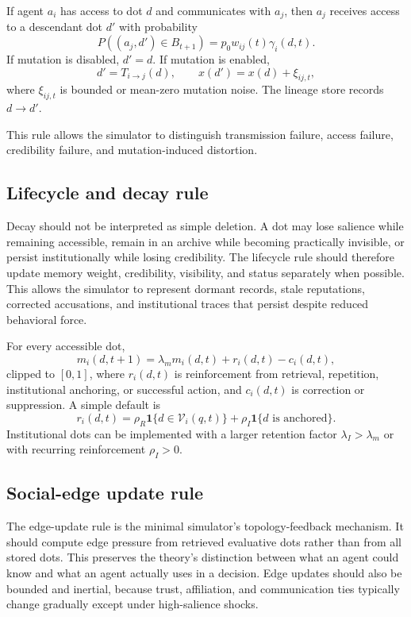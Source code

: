\documentclass[11pt]{article}
\theoremstyle{remark}
\begin{document}
If agent $a_i$ has access to dot $d$ and communicates with $a_j$, then
$a_j$ receives access to a descendant dot $d'$ with probability
$$
P((a_j,d')\in B_{t+1})=p_0 w_{ij}(t)\gamma_i(d,t).
$$
If mutation is disabled, $d'=d$. If mutation is enabled,
$$
d'=T_{i\to j}(d),
\qquad
x(d')=x(d)+\xi_{ij,t},
$$
where $\xi_{ij,t}$ is bounded or mean-zero mutation noise. The lineage
store records $d\to d'$.

This rule allows the simulator to distinguish transmission failure,
access failure, credibility failure, and mutation-induced distortion.

\subsection{Lifecycle and decay rule}\label{minimal-lifecycle-decay-rule}

Decay should not be interpreted as simple deletion. A dot may lose salience while remaining accessible, remain in an archive while becoming practically invisible, or persist institutionally while losing credibility. The lifecycle rule should therefore update memory weight, credibility, visibility, and status separately when possible. This allows the simulator to represent dormant records, stale reputations, corrected accusations, and institutional traces that persist despite reduced behavioral force.


For every accessible dot,
$$
m_i(d,t+1)=\lambda_m m_i(d,t)+r_i(d,t)-c_i(d,t),
$$
clipped to $[0,1]$, where $r_i(d,t)$ is reinforcement from retrieval,
repetition, institutional anchoring, or successful action, and
$c_i(d,t)$ is correction or suppression. A simple default is
$$
r_i(d,t)=\rho_R\mathbf 1\{d\in\mathcal V_i(q,t)\}
+\rho_I\mathbf 1\{d\text{ is anchored}\}.
$$
Institutional dots can be implemented with a larger retention factor
$\lambda_I>\lambda_m$ or with recurring reinforcement $\rho_I>0$.

\subsection{Social-edge update rule}\label{minimal-social-edge-update-rule}

The edge-update rule is the minimal simulator's topology-feedback mechanism. It should compute edge pressure from retrieved evaluative dots rather than from all stored dots. This preserves the theory's distinction between what an agent could know and what an agent actually uses in a decision. Edge updates should also be bounded and inertial, because trust, affiliation, and communication ties typically change gradually except under high-salience shocks.
\end{document}
